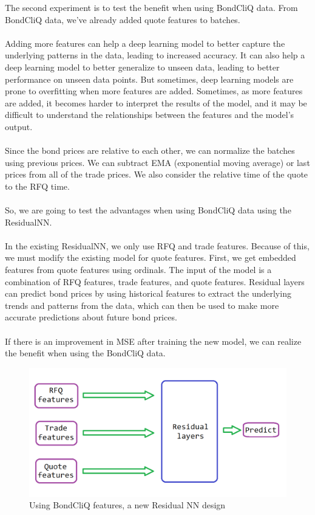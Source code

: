 \documentclass{article}
\begin{document}
The second experiment is to test the benefit when using BondCliQ data. From BondCliQ data, we've already added quote features to batches.\\
\\
Adding more features can help a deep learning model to better capture the underlying patterns in the data, leading to increased accuracy. It can also help a deep learning model to better generalize to unseen data, leading to better performance on unseen data points. But sometimes, deep learning models are prone to overfitting when more features are added. Sometimes, as more features are added, it becomes harder to interpret the results of the model, and it may be difficult to understand the relationships between the features and the model’s output.\\
\\
Since the bond prices are relative to each other, we can normalize the batches using previous prices. We can subtract EMA (exponential moving average) or last prices from all of the trade prices. We also consider the relative time of the quote to the RFQ time.\\
\\
So, we are going to test the advantages when using BondCliQ data using the ResidualNN.\\
\\
In the existing ResidualNN, we only use RFQ and trade features. Because of this, we must modify the existing model for quote features. First, we get embedded features from quote features using ordinals. The input of the model is a combination of RFQ features, trade features, and quote features. Residual layers can predict bond prices by using historical features to extract the underlying trends and patterns from the data, which can then be used to make more accurate predictions about future bond prices.\\
\\
If there is an improvement in MSE after training the new model, we can realize the benefit when using the BondCliQ data.\\

\begin{figure}
    \centering
    \includegraphics[scale=0.5]{NN-architecture-2.png}
    \caption{Using BondCliQ features, a new Residual NN design}
    \label{fig:my_label}
\end{figure}
\end{document}

